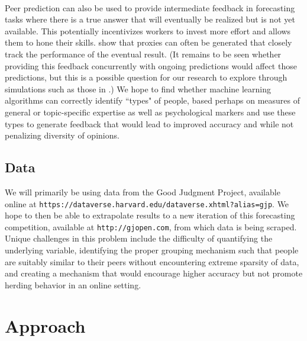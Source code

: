 \documentclass[a4paper, 11pt]{article}
\begin{document}
\paragraph{} Peer prediction can also be used to provide intermediate feedback in forecasting tasks where there is a true answer that will eventually be realized but is not yet available. This potentially incentivizes workers to invest more effort and allows them to hone their skills. \citet{witkowski2017proper} show that proxies can often be generated that closely track the performance of the eventual result. (It remains to be seen whether providing this feedback concurrently with ongoing predictions would affect those predictions, but this is a possible question for our research to explore through simulations such as those in \citet{shnayder2016measuring}.) We hope to find whether machine learning algorithms can correctly identify ``types" of people, based perhaps on measures of general or topic-specific expertise as well as psychological markers and use these types to generate feedback that would lead to improved accuracy and while not penalizing diversity of opinions. 
\subsection{Data}
We will primarily be using data from the Good Judgment Project, available online at  \texttt{https://dataverse.harvard.edu/dataverse.xhtml?alias=gjp}. We hope to then be able to extrapolate results to a new iteration of this forecasting competition, available at \texttt{http://gjopen.com}, from which data is being scraped. Unique challenges in this problem include the difficulty of quantifying the underlying variable, identifying the proper grouping mechanism such that people are suitably similar to their peers without encountering extreme sparsity of data, and creating a mechanism that would encourage higher accuracy but not promote herding behavior in an online setting.

\section{Approach}
\end{document}
